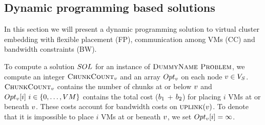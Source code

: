 \subsection{Dynamic programming based solutions}

In this section we will present a dynamic programming solution to
virtual cluster embedding with flexible placement (FP), communication
among VMs (CC) and bandwidth constraints (BW).


\newcommand{\Opt}{\ensuremath{Opt}}
\newcommand{\Children}{\ensuremath{children}}

\newcommand{\Uplink}{\ensuremath{\textsc{uplink}}}
\newcommand{\ChunkCount}{\ensuremath{\textsc{ChunkCount}}}


To compute a solution $SOL$ for an instance of $\textsc{DummyName Problem}$, we compute an 
integer $\ChunkCount_\SubstrateNode$ and an array 
$\Opt_\SubstrateNode$ on each node $v \in 
V_S$. $\ChunkCount_\SubstrateNode$ contains the number of chunks at 
or below 
$v$ and $\Opt_\SubstrateNode[i]~i\in \{0,\dots,\Vms\}$ contains the 
total cost ($b_1$ + $b_2$) for placing $i$ VMs at or beneath 
$v$. These costs account for bandwidth costs on 
$\Uplink(\SubstrateNode)$. To denote that it is impossible to place $i$ VMs at 
or beneath $v$, we set $\Opt_\SubstrateNode[i] = \infty$.


